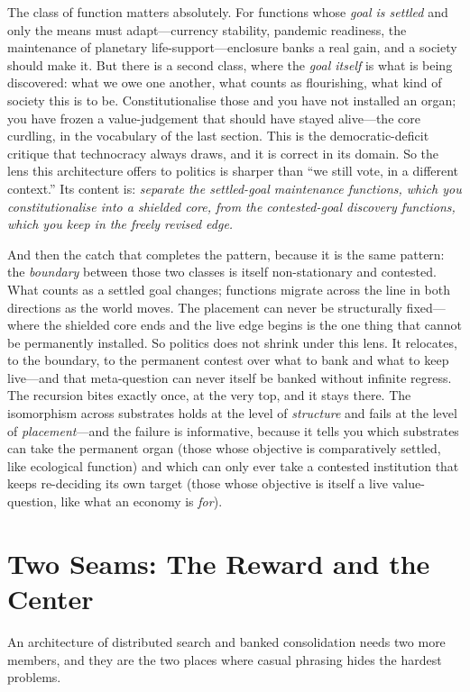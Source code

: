 \documentclass{article}
\begin{document}
The class of function matters absolutely. For functions whose \textit{goal is settled} and only the means must adapt---currency stability, pandemic readiness, the maintenance of planetary life-support---enclosure banks a real gain, and a society should make it. But there is a second class, where the \textit{goal itself} is what is being discovered: what we owe one another, what counts as flourishing, what kind of society this is to be. Constitutionalise those and you have not installed an organ; you have frozen a value-judgement that should have stayed alive---the core curdling, in the vocabulary of the last section. This is the democratic-deficit critique that technocracy always draws, and it is correct in its domain. So the lens this architecture offers to politics is sharper than ``we still vote, in a different context.'' Its content is: \textit{separate the settled-goal maintenance functions, which you constitutionalise into a shielded core, from the contested-goal discovery functions, which you keep in the freely revised edge.}

And then the catch that completes the pattern, because it is the same pattern: the \textit{boundary} between those two classes is itself non-stationary and contested. What counts as a settled goal changes; functions migrate across the line in both directions as the world moves. The placement can never be structurally fixed---where the shielded core ends and the live edge begins is the one thing that cannot be permanently installed. So politics does not shrink under this lens. It relocates, to the boundary, to the permanent contest over what to bank and what to keep live---and that meta-question can never itself be banked without infinite regress. The recursion bites exactly once, at the very top, and it stays there. The isomorphism across substrates holds at the level of \textit{structure} and fails at the level of \textit{placement}---and the failure is informative, because it tells you which substrates can take the permanent organ (those whose objective is comparatively settled, like ecological function) and which can only ever take a contested institution that keeps re-deciding its own target (those whose objective is itself a live value-question, like what an economy is \textit{for}).

\section*{Two Seams: The Reward and the Center}

An architecture of distributed search and banked consolidation needs two more members, and they are the two places where casual phrasing hides the hardest problems.
\end{document}
